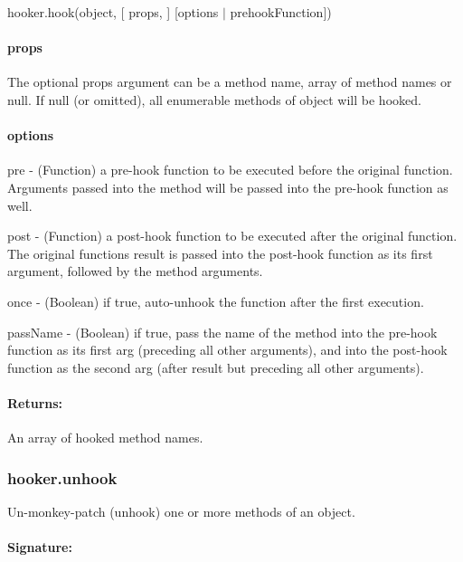 {\ttfamily hooker.\+hook(object, \mbox{[} props, \mbox{]} \mbox{[}options $\vert$ prehook\+Function\mbox{]})} \paragraph*{{\ttfamily props}}

The optional {\ttfamily props} argument can be a method name, array of method names or null. If null (or omitted), all enumerable methods of {\ttfamily object} will be hooked. \paragraph*{{\ttfamily options}}


\begin{DoxyItemize}
\item {\ttfamily pre} -\/ (Function) a pre-\/hook function to be executed before the original function. Arguments passed into the method will be passed into the pre-\/hook function as well.
\item {\ttfamily post} -\/ (Function) a post-\/hook function to be executed after the original function. The original function\textquotesingle{}s result is passed into the post-\/hook function as its first argument, followed by the method arguments.
\item {\ttfamily once} -\/ (Boolean) if true, auto-\/unhook the function after the first execution.
\item {\ttfamily pass\+Name} -\/ (Boolean) if true, pass the name of the method into the pre-\/hook function as its first arg (preceding all other arguments), and into the post-\/hook function as the second arg (after result but preceding all other arguments).
\end{DoxyItemize}

\paragraph*{Returns\+:}

An array of hooked method names.

\subsubsection*{hooker.\+unhook}

Un-\/monkey-\/patch (unhook) one or more methods of an object. \paragraph*{Signature\+:}

